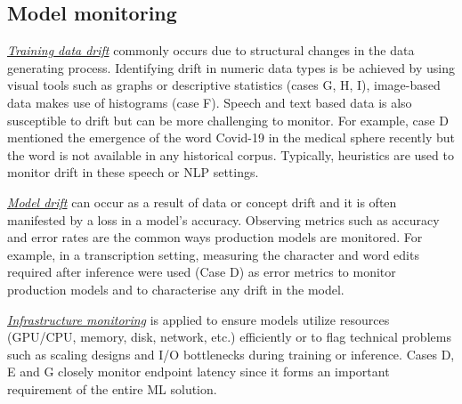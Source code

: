 \subsection{Model monitoring} 

\underline{\emph{Training data drift}} commonly occurs due to structural changes in the data generating process. Identifying drift in numeric data types is be achieved by using visual tools such as graphs or descriptive statistics (cases G, H, I), image-based data makes use of histograms (case F). Speech and text based data is also susceptible to drift but can be more challenging to monitor. For example, case D mentioned the emergence of the word Covid-19 in the medical sphere recently but the word is not available in any historical corpus. Typically, heuristics are used to monitor drift in these speech or NLP settings.

\underline{\emph{Model drift}} can occur as a result of data or concept drift and it is often manifested by a loss in a model's accuracy. Observing metrics such as accuracy and error rates are the common ways production models are monitored. For example, in a transcription setting, measuring the character and word edits required after inference were used (Case D) as error metrics to monitor production models and to characterise any drift in the model.

\underline{\emph{Infrastructure monitoring}}
is applied to ensure models utilize resources (GPU/CPU, memory, disk, network, etc.) efficiently or to flag technical problems such as scaling designs and I/O bottlenecks during training or inference. Cases D, E and G closely monitor endpoint latency since it forms an important requirement of the entire ML solution.


